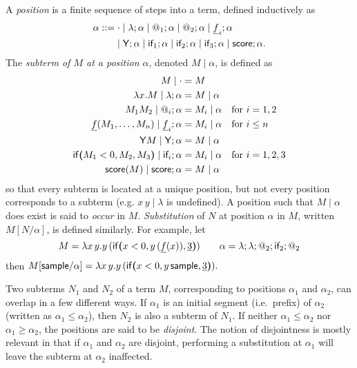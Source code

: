 A \emph{position} is a finite sequence of steps into a term, defined inductively as
\begin{align*}
\alpha ::= & \; {\cdot} \mid \lambda ; \alpha \mid @_1 ; \alpha \mid @_2 ; \alpha \mid \underline f_i ; \alpha \\
& {} \mid \mathsf{Y} ; \alpha \mid \textsf{if}_1 ; \alpha \mid \textsf{if}_2 ; \alpha \mid \textsf{if}_3 ; \alpha \mid \mathsf{score} ; \alpha.
\end{align*}
The \emph{subterm of $M$ at a position $\alpha$}, denoted $M \mid \alpha$, is defined as
\begin{align*}
M \mid \cdot & = M \\
\lambda x. M \mid \lambda ; \alpha & = M \mid \alpha \\
M_1 M_2 \mid @_i ; \alpha & = M_i \mid \alpha \quad \text{for } i = 1,2 \\
\underline f(M_1,\dots,M_n) \mid \underline f_i ; \alpha & = M_i \mid \alpha \quad \text{for }i \leq n \\
\mathsf{Y} M \mid \mathsf{Y} ; \alpha & = M \mid \alpha \\
\mathsf{if}\boldsymbol{(}M_1 < 0, M_2, M_3\boldsymbol{)} \mid \textsf{if}_i ; \alpha & = M_i \mid \alpha \quad \text{for } i = 1,2,3 \\
\mathsf{score}(M) \mid \mathsf{score} ; \alpha & = M \mid \alpha
\end{align*}
so that every subterm is located at a unique position, but not every position corresponds to a subterm (e.g. $x \, y \mid \lambda$ is undefined). 
A position such that $M\mid \alpha$ does exist is said to \emph{occur} in $M$. 
\emph{Substitution} of $N$ at position $\alpha$ in $M$, written $M[N/\alpha]$, is defined similarly.
For example, let 
\[
M = \lambda x \, y. y \, (\mathsf{if}\boldsymbol{(}x < 0, y \, (\underline f (x)), \underline 3\boldsymbol{)})
\qquad
\alpha =\lambda ; \lambda ; @_2 ; \textsf{if}_2 ; @_2
\]
then 
\(
M[\mathsf{sample} / \alpha] = \lambda x \, y. y \, (\mathsf{if}\boldsymbol{(}x < 0, y \, \mathsf{sample}, \underline 3\boldsymbol{)}).
\)

Two subterms $N_1$ and $N_2$ of a term $M$, corresponding to positions $\alpha_1$ and $\alpha_2$, can overlap in a few different ways. 
If $\alpha_1$ is an initial segment (i.e.~prefix) of $\alpha_2$ (written as $\alpha_1 \leq \alpha_2$), then $N_2$ is also a subterm of $N_1$. If neither $\alpha_1 \leq \alpha_2$ nor $\alpha_1 \geq \alpha_2$, the positions are said to be \emph{disjoint}. 
The notion of disjointness is mostly relevant in that if $\alpha_1$ and $\alpha_2$ are disjoint, performing a substitution at $\alpha_1$ will leave the subterm at $\alpha_2$ inaffected.
  

